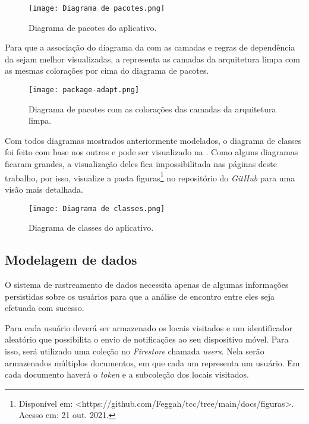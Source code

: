\begin{figure}[!htb]
  \centering
  \texttt{[image: Diagrama de pacotes.png]}
  \caption{Diagrama de pacotes do aplicativo.}
  \label{fig:package}
\end{figure}

Para que a associação do diagrama da  com as camadas e regras de dependência da  sejam melhor visualizadas, a  representa as camadas da arquitetura limpa com as mesmas colorações por cima do diagrama de pacotes.

\begin{figure}[!htb]
  \centering
  \texttt{[image: package-adapt.png]}
  \caption{Diagrama de pacotes com as colorações das camadas da arquitetura limpa.}
  \label{fig:package2}
\end{figure}

Com todos diagramas mostrados anteriormente modelados, o diagrama de classes foi feito com base nos outros e pode ser visualizado na . Como alguns diagramas ficaram grandes, a visualização deles fica impossibilitada nas páginas deste trabalho, por isso, visualize a pasta figuras\footnote{Disponível em: <https://github.com/Feggah/tcc/tree/main/docs/figuras>. Acesso em: 21 out. 2021.} no repositório do \textit{GitHub} para uma visão mais detalhada.

\begin{figure}[!htb]
  \centering
  \texttt{[image: Diagrama de classes.png]}
  \caption{Diagrama de classes do aplicativo.}
  \label{fig:diagramadeclasses}
\end{figure}

\subsection{Modelagem de dados}\label{sec:modelagemdedados}
O sistema de rastreamento de dados necessita apenas de algumas informações persistidas sobre os usuários para que a análise de encontro entre eles seja efetuada com sucesso. 

Para cada usuário deverá ser armazenado os locais visitados e um identificador aleatório que possibilita o envio de notificações ao seu dispositivo móvel. Para isso, será utilizado uma coleção no \textit{Firestore} chamada \textit{users}. Nela serão armazenados múltiplos documentos, em que cada um representa um usuário. Em cada documento haverá o \textit{token} e a subcoleção dos locais visitados.

